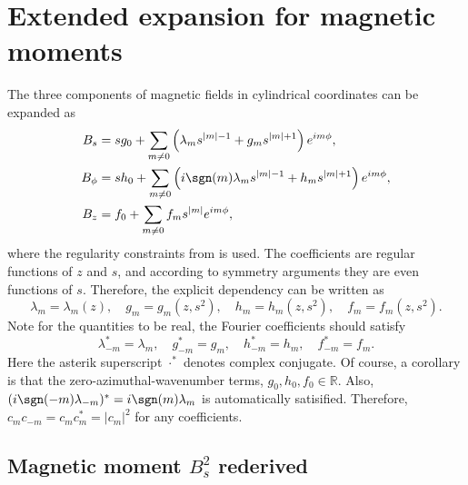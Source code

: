 \section{Extended expansion for magnetic moments}

The three components of magnetic fields in cylindrical coordinates can be expanded as
\begin{equation}
\begin{aligned}
    B_s &= s g_0 + \sum_{m\neq 0} \left(\lambda_m s^{|m|-1} + g_m s^{|m|+1}\right) e^{im\phi}, \\ 
    B_\phi &= s h_0 + \sum_{m\neq 0} \left(i \sgn(m) \lambda_m s^{|m|-1} + h_m s^{|m|+1}\right) e^{im\phi}, \\ 
    B_z &= f_0 + \sum_{m\neq 0} f_m s^{|m|} e^{im\phi},
\end{aligned}
\end{equation}
where the regularity constraints from \textcite{lewis_physical_1990} is used. The coefficients are regular functions of $z$ and $s$, and according to symmetry arguments they are even functions of $s$. Therefore, the explicit dependency can be written as
\begin{equation}
    \lambda_m = \lambda_m(z),\quad g_m = g_m(z, s^2),\quad h_m = h_m(z, s^2),\quad f_m = f_m(z, s^2).
\end{equation}
Note for the quantities to be real, the Fourier coefficients should satisfy
\[
    \lambda_{-m}^* = \lambda_m,\quad g_{-m}^* = g_m,\quad h_{-m}^* = h_m,\quad f_{-m}^* = f_m.
\]
Here the asterik superscript $\cdot^*$ denotes complex conjugate. Of course, a corollary is that the zero-azimuthal-wavenumber terms, $g_0, h_0, f_0 \in \mathbb{R}$. Also, $(i \sgn(-m) \lambda_{-m})^* = i\sgn(m) \lambda_m$ is automatically satisified. Therefore, $c_m c_{-m} = c_m c_m^* = |c_m|^2$ for any coefficients.

\subsection{Magnetic moment $B_s^2$ rederived}

